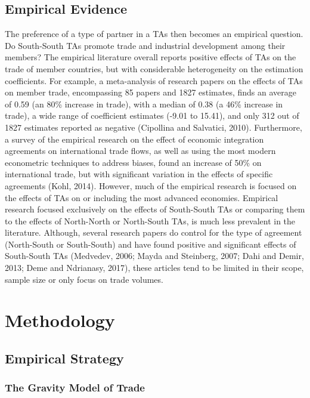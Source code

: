 \documentclass[12pt]{article}%
\begin{document}
\subsection{Empirical Evidence}%
\label{subsec:EmpiricalEvidence}%

%
The preference of a type of partner in a TAs then becomes an empirical
question. Do South-South TAs promote trade and industrial development
among their members? The empirical literature overall reports positive
effects of TAs on the trade of member countries, but with considerable
heterogeneity on the estimation coefficients. For example, a
meta-analysis of research papers on the effects of TAs on member trade,
encompassing 85 papers and 1827 estimates, finds an average of 0.59 (an
80\% increase in trade), with a median of 0.38 (a 46\% increase in
trade), a wide range of coefficient estimates (-9.01 to 15.41), and only
312 out of 1827 estimates reported as negative (Cipollina and Salvatici,
2010). Furthermore, a survey of the empirical research on the effect of
economic integration agreements on international trade flows, as well as
using the most modern econometric techniques to address biases, found an
increase of 50\% on international trade, but with significant variation
in the effects of specific agreements (Kohl, 2014). However, much of the
empirical research is focused on the effects of TAs on or including the
most advanced economies. Empirical research focused exclusively on the
effects of South-South TAs or comparing them to the effects of
North-North or North-South TAs, is much less prevalent in the
literature. Although, several research papers do control for the type of
agreement (North-South or South-South) and have found positive and
significant effects of South-South TAs (Medvedev, 2006; Mayda and
Steinberg, 2007; Dahi and Demir, 2013; Deme and Ndrianasy, 2017), these
articles tend to be limited in their scope, sample size or only focus on
trade volumes.

%
\section{Methodology}%
\label{sec:Methodology}%
\subsection{Empirical Strategy}%
\label{subsec:EmpiricalStrategy}%
\subsubsection{The Gravity Model of Trade}%
\label{ssubsec:TheGravityModelofTrade}%
\end{document}
